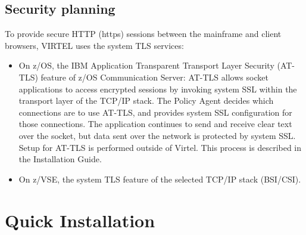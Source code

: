 \documentclass[letterpaper,10pt,english]{sphinxmanual}
\begin{document}
\section{Security planning}
\label{\detokenize{Getting_Started:security-planning}}
To provide secure HTTP (https) sessions between the mainframe and client browsers, VIRTEL uses the system TLS services:
\begin{itemize}
\item {} 
On z/OS, the IBM Application Transparent Transport Layer Security (AT-TLS) feature of z/OS Communication Server: AT-TLS allows socket applications to access encrypted sessions by invoking system SSL within the transport layer of the TCP/IP stack. The Policy Agent decides which connections are to use AT-TLS, and provides system SSL configuration for those connections. The application continues to send and receive clear text over the socket, but data sent over the network is protected by system SSL. Setup for AT-TLS is performed outside of Virtel. This process is described in the Installation Guide.

\item {} 
On z/VSE, the system TLS feature of the selected TCP/IP stack (BSI/CSI).

\end{itemize}


\chapter{Quick Installation}
\label{\detokenize{Getting_Started:quick-installation}}
\end{document}
